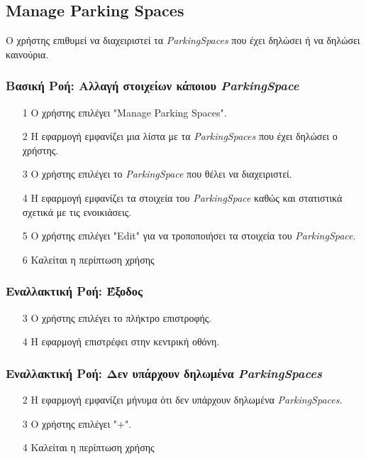 \subsection{Manage Parking Spaces}
\label{uc:manage-parking-spaces}

Ο χρήστης επιθυμεί να διαχειριστεί τα \textit{ParkingSpaces} που έχει δηλώσει
ή να δηλώσει καινούρια.

\subsubsection{Βασική Ροή: Αλλαγή στοιχείων κάποιου \textit{ParkingSpace}}

\begin{enumerate}
    \item[1] Ο χρήστης επιλέγει "Manage Parking Spaces".
    \item[2] Η εφαρμογή εμφανίζει μια λίστα με τα \textit{ParkingSpaces} που έχει
        δηλώσει ο χρήστης.
    \item[3] Ο χρήστης επιλέγει το \textit{ParkingSpace} που θέλει να διαχειριστεί.
    \item[4] Η εφαρμογή εμφανίζει τα στοιχεία του \textit{ParkingSpace} καθώς και
        στατιστικά σχετικά με τις ενοικιάσεις.
    \item[5] Ο χρήστης επιλέγει "Edit" για να τροποποιήσει τα στοιχεία του
        \textit{ParkingSpace}.
    \item[6] Καλείται η περίπτωση χρήσης 
\end{enumerate}

\subsubsection{Εναλλακτική Ροή: Έξοδος}

\begin{enumerate}
    \item[3] Ο χρήστης επιλέγει το πλήκτρο επιστροφής.
    \item[4] Η εφαρμογή επιστρέφει στην κεντρική οθόνη.
\end{enumerate}

\subsubsection{Εναλλακτική Ροή: Δεν υπάρχουν δηλωμένα \textit{ParkingSpaces}}

\begin{enumerate}
    \item[2] Η εφαρμογή εμφανίζει μήνυμα ότι δεν υπάρχουν δηλωμένα
        \textit{ParkingSpaces}.
    \item[3] Ο χρήστης επιλέγει "+".
    \item[4] Καλείται η περίπτωση χρήσης 
\end{enumerate}

